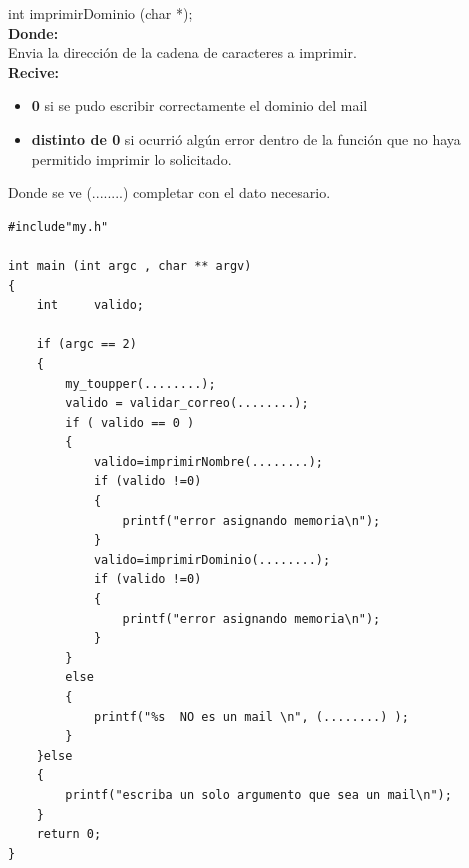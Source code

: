 \documentclass[12pt]{article} %
\begin{document}
\begin{enumerate}
{\color{blue}int} imprimirDominio ({\color{blue}char} *);\\
{\bf Donde:}\\
Envia la dirección de la cadena de caracteres a imprimir.\\
{\bf Recive:}
	\begin{itemize}
	\item {\bf 0} si se pudo escribir correctamente el dominio del mail
	\item {\bf distinto de 0} si ocurrió algún error dentro de la función que no haya permitido imprimir lo solicitado. 
	\end{itemize}
\end{enumerate}

\newpage

Donde se ve  {\color{red}(........)}  completar con el dato necesario.\\ 
 \begin{lstlisting}
#include"my.h"

int main (int argc , char ** argv)
{
    int     valido;
    
    if (argc == 2)
    {
        my_toupper(........);
        valido = validar_correo(........);    
        if ( valido == 0 )
        {
            valido=imprimirNombre(........);
            if (valido !=0)
            {
                printf("error asignando memoria\n");
            }
            valido=imprimirDominio(........);
            if (valido !=0)
            {
                printf("error asignando memoria\n");
            }
        }
        else
        {
            printf("%s  NO es un mail \n", (........) );
        }
    }else
    {
        printf("escriba un solo argumento que sea un mail\n");
    }
    return 0;
}
   \end{lstlisting}
 
\end{document}
